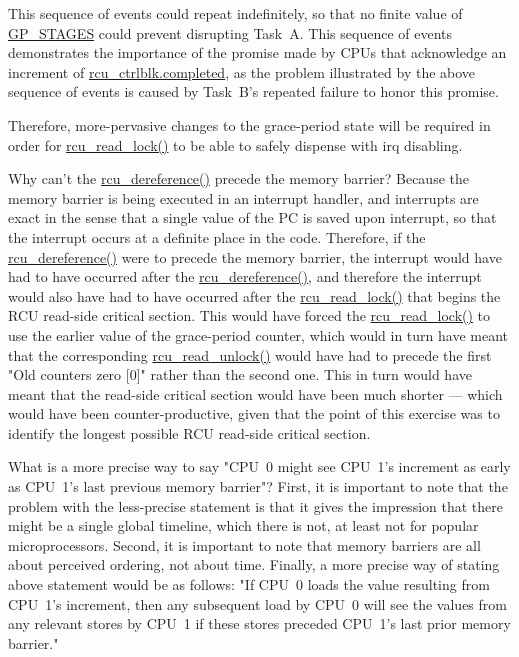 	This sequence of events could repeat indefinitely, so that no finite
	value of \url{GP_STAGES} could prevent disrupting Task~A.
	This sequence of events demonstrates the importance of the promise
	made by CPUs that acknowledge an increment of
	\url{rcu_ctrlblk.completed}, as the problem illustrated by the
	above sequence of events is caused by Task~B's repeated failure
	to honor this promise.

	Therefore, more-pervasive changes to the grace-period state will be
	required in order for \url{rcu_read_lock()} to be able to safely
	dispense with irq disabling.

\QuickQ{}
	Why can't the \url{rcu_dereference()}
	precede the memory barrier?
\QuickA{}
	Because the memory barrier is being executed in
	an interrupt handler, and interrupts are exact in the sense that
	a single value of the PC is saved upon interrupt, so that the
	interrupt occurs at a definite place in the code.
	Therefore, if the
	\url{rcu_dereference()} were to precede the memory barrier,
	the interrupt would have had to have occurred after the
	\url{rcu_dereference()}, and therefore
	the interrupt would also have had to have occurred after the
	\url{rcu_read_lock()} that begins the RCU read-side critical
	section.
	This would have forced the \url{rcu_read_lock()} to use
	the earlier value of the grace-period counter, which would in turn
	have meant that the corresponding \url{rcu_read_unlock()}
	would have had to precede the first "Old counters zero [0]" rather
	than the second one.
	This in turn would have meant that the read-side critical section
	would have been much shorter --- which would have been
	counter-productive,
	given that the point of this exercise was to identify the longest
	possible RCU read-side critical section.

\QuickQ{}
	What is a more precise way to say "CPU~0
	might see CPU~1's increment as early as CPU~1's last previous
	memory barrier"?
\QuickA{}
	First, it is important to note that the problem with
	the less-precise statement is that it gives the impression that there
	might be a single global timeline, which there is not, at least not for
	popular microprocessors.
	Second, it is important to note that memory barriers are all about
	perceived ordering, not about time.
	Finally, a more precise way of stating above statement would be as
	follows: "If CPU~0 loads the value resulting from CPU~1's
	increment, then any subsequent load by CPU~0 will see the
	values from any relevant stores by CPU~1 if these stores
	preceded CPU~1's last prior memory barrier."


